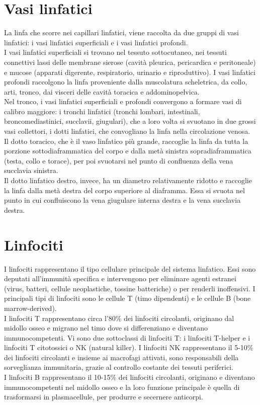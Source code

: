 \section{Vasi linfatici}
La linfa che scorre nei capillari linfatici, viene raccolta da due gruppi di vasi linfatici: i vasi linfatici 
superficiali e i vasi linfatici profondi.\\ 
I vasi linfatici superficiali si trovano nel tessuto sottocutaneo, nei tessuti connettivi lassi delle membrane sierose 
(cavità pleurica, pericardica e peritoneale) e mucose (apparati digerente, respiratorio, urinario e riproduttivo). 
I vasi linfatici profondi raccolgono la linfa proveniente dalla muscolatura scheletrica, da collo, arti, tronco, 
dai visceri delle cavità toracica e addominopelvica\cite{BOOK1}.\\
Nel tronco, i vasi linfatici superficiali e profondi convergono a formare vasi di calibro maggiore: 
i tronchi linfatici (tronchi lombari, intestinali, broncomediastinici, succlavii, giugulari), 
che a loro volta si svuotano in due grossi vasi collettori, i dotti linfatici, che convogliano la linfa 
nella circolazione venosa.\\  
Il dotto toracico, che è il vaso linfatico più grande, raccoglie la linfa da tutta la porzione sottodiaframmatica 
del corpo e dalla metà sinistra sopradiaframmatica (testa, collo e torace), per poi svuotarsi nel punto di confluenza della 
vena succlavia sinistra.\\ 
Il dotto linfatico destro, invece, ha un diametro relativamente ridotto e raccoglie la linfa dalla metà destra 
del corpo superiore al diaframma. Essa si svuota nel punto in cui confluiscono la vena giugulare interna destra e la 
vena succlavia destra\cite{BOOK1}.
 
\section{Linfociti}
I linfociti rappresentano il tipo cellulare principale del sistema linfatico. 
Essi sono deputati all'immunità specifica e intervengono per eliminare agenti estranei 
(virus, batteri, cellule neoplastiche, tossine batteriche) o per renderli inoffensivi. 
I principali tipi di linfociti sono le cellule T (timo dipendenti) e le cellule B (bone marrow-derived)\cite{BOOK2}.\\
I linfociti T rappresentano circa l’80\% dei linfociti circolanti, originano dal midollo osseo e migrano nel timo dove si 
differenziano e diventano immunocompetenti. 
Vi sono due sottoclassi di linfociti T: i linfociti T-helper e i linfociti T citotossici o NK (natural killer). 
I linfociti NK rappresentano il 5-10\% dei linfociti circolanti e insieme ai macrofagi attivati, 
sono responsabili della sorveglianza immunitaria, grazie al controllo costante dei tessuti periferici.\\
I linfociti B rappresentano il 10-15\% dei linfociti circolanti, originano e diventano immunocompetenti 
nel midollo osseo e la loro funzione principale è quella di trasformarsi in plasmacellule, 
per produrre e secernere anticorpi\cite{BOOK2}.


